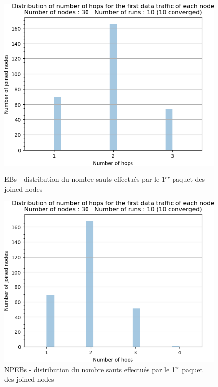 \documentclass[]{report}
\begin{document}
\begin{figure}[!ht]
	\begin{minipage}{0.49\textwidth}
		\centering
		\includegraphics[width=\textwidth]{results/EB/firsthop.hist}
		\caption{EBs - distribution du nombre sauts effectués par le 1$^{er}$ paquet des joined nodes}
		\label{fig:EBfirsthop}
	\end{minipage}\hfill
	\begin{minipage}{0.5\textwidth}
		\centering
		\includegraphics[width=\textwidth]{results/NPEB/firsthop.hist}
		\caption{NPEBs - distribution du nombre sauts effectués par le 1$^{er}$ paquet des joined nodes}
		\label{fig:NPEBfirsthop}
	\end{minipage}	
\end{figure}
\end{document}
